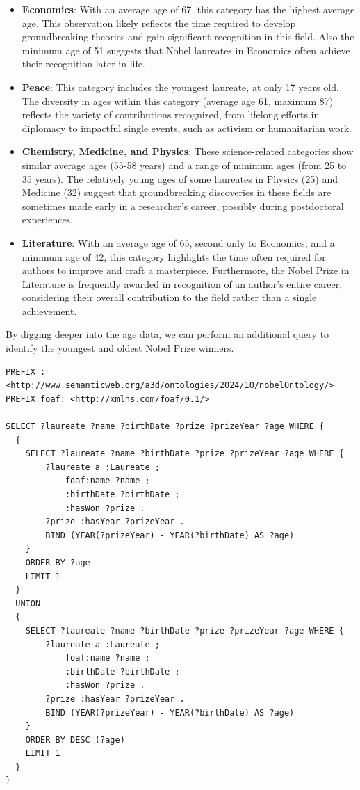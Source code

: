 \documentclass{article}
\begin{document}
\begin{itemize}
	\item \textbf{Economics}: With an average age of 67, this category has the highest average age.
	      This observation likely reflects the time required to develop groundbreaking theories and gain significant
	      recognition in this field. Also the minimum age of 51 suggests that Nobel laureates in Economics often
	      achieve their recognition later in life.

	\item \textbf{Peace}: This category includes the youngest laureate, at only 17 years old.
	      The diversity in ages within this category (average age 61, maximum 87) reflects the variety of
	      contributions recognized, from lifelong efforts in diplomacy to impactful single events, such as activism
	      or humanitarian work.

	\item \textbf{Chemistry, Medicine, and Physics}: These science-related categories show similar average ages
	      (55-58 years) and a range of minimum ages (from 25 to 35 years). The relatively young ages of some laureates
	      in Physics (25) and Medicine (32) suggest that groundbreaking discoveries in these fields are sometimes made
	      early in a researcher's career, possibly during postdoctoral experiences.

	\item \textbf{Literature}: With an average age of 65, second only to Economics, and a minimum age of 42, this
	      category highlights the time often required for authors to improve and craft a masterpiece.
          Furthermore, the Nobel Prize in Literature is frequently awarded in recognition of an author's
	      entire career, considering their overall contribution to the field rather than a single achievement.
\end{itemize}

By digging deeper into the age data, we can perform an additional query to identify the youngest and oldest
Nobel Prize winners.

\begin{lstlisting}
PREFIX : <http://www.semanticweb.org/a3d/ontologies/2024/10/nobelOntology/>
PREFIX foaf: <http://xmlns.com/foaf/0.1/>

SELECT ?laureate ?name ?birthDate ?prize ?prizeYear ?age WHERE {
  {
    SELECT ?laureate ?name ?birthDate ?prize ?prizeYear ?age WHERE {
        ?laureate a :Laureate ;
            foaf:name ?name ;
            :birthDate ?birthDate ;
            :hasWon ?prize .
        ?prize :hasYear ?prizeYear .
        BIND (YEAR(?prizeYear) - YEAR(?birthDate) AS ?age)
    }
    ORDER BY ?age
    LIMIT 1
  }
  UNION
  {
    SELECT ?laureate ?name ?birthDate ?prize ?prizeYear ?age WHERE {
        ?laureate a :Laureate ;
            foaf:name ?name ;
            :birthDate ?birthDate ;
            :hasWon ?prize .
        ?prize :hasYear ?prizeYear .
        BIND (YEAR(?prizeYear) - YEAR(?birthDate) AS ?age)
    }
    ORDER BY DESC (?age)
    LIMIT 1
  }
}
\end{lstlisting}
\end{document}
